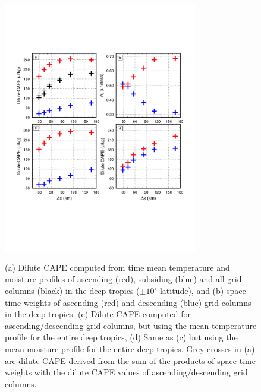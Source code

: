\documentclass[times]{qjrms4}
\begin{document}
\begin{figure}
\begin{center}
\noindent\includegraphics[width=20pc,angle=0]{figs/temp_cape.pdf}\\
\end{center}
\caption{(a) Dilute CAPE computed from time mean temperature and moisture profiles of ascending (red), subsiding (blue) and all grid columns (black) in the deep tropics ($\pm 10^{\circ}$ latitude), and (b) space-time weights of ascending (red) and descending (blue) grid columns in the deep tropics. (c) Dilute CAPE computed for ascending/descending grid columns, but using the mean temperature profile for the entire deep tropics, (d) Same as (c) but using the mean moisture profile for the entire deep tropics. Grey crosses in (a) are dilute CAPE derived from the sum of the products of space-time weights with the dilute CAPE values of ascending/descending grid columns.}
\label{fig:cape}
\end{figure}
\end{document}
